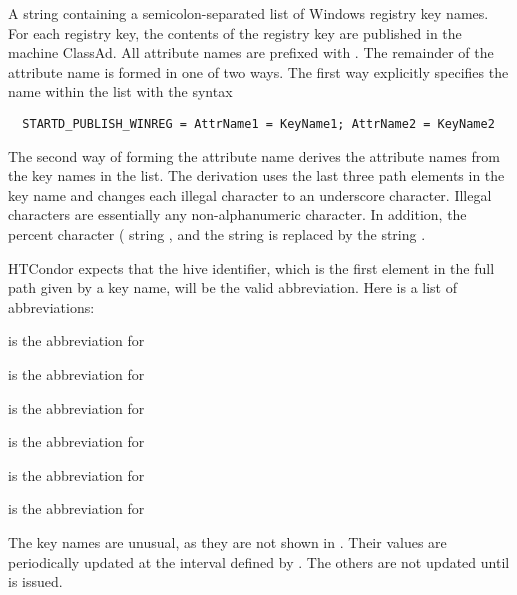 \begin{description}
\label{param:StartdPublishWinreg}
\item[\Macro{STARTD\_PUBLISH\_WINREG}]
  A string containing a semicolon-separated list of Windows registry key names.
  For each registry key, the contents of the registry key are published in
  the machine ClassAd.
  All attribute names are prefixed with . 
  The remainder of the attribute name is formed in one of two ways.
  The first way explicitly specifies the name within the list with the
  syntax
\begin{verbatim}
  STARTD_PUBLISH_WINREG = AttrName1 = KeyName1; AttrName2 = KeyName2
\end{verbatim}

  The second way of forming the attribute name derives the attribute names
  from the key names in the list.
  The derivation uses the last three path elements in the key name and changes
  each illegal character to an underscore character.
  Illegal characters are essentially any non-alphanumeric character. 
  In addition, the percent character (\verb@%@) is replaced by the
  string ,
  and the string  is replaced by the string .

  HTCondor expects that the hive identifier, 
  which is the first element in the full path given by a key name,
  will be the valid abbreviation.
  Here is a list of abbreviations:
  \begin{description}
    \item {} is the abbreviation for  
    \item {} is the abbreviation for  
    \item {} is the abbreviation for  
    \item {} is the abbreviation for  
    \item {} is the abbreviation for  
    \item {} is the abbreviation for  
  \end{description}
  The  key names are unusual, 
  as they are not shown in .
  Their values are periodically updated at the interval defined by 
  . 
  The others are not updated until  is issued.


\end{description}
